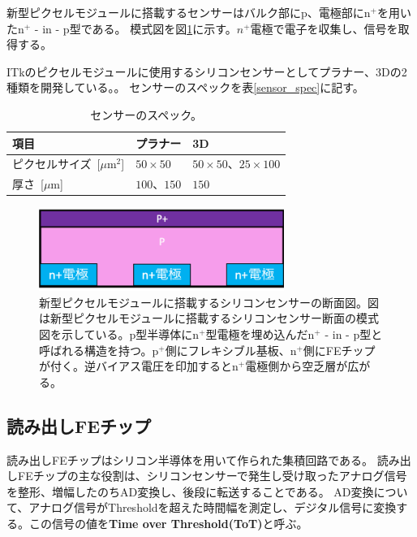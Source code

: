 新型ピクセルモジュールに搭載するセンサーはバルク部にp、電極部にn${}^+$を用いたn${}^+$ - in - p型である。
模式図を図\ref{sensor_image}に示す。$n^+$電極で電子を収集し、信号を取得する。

ITkのピクセルモジュールに使用するシリコンセンサーとしてプラナー、3Dの2種類を開発している。\cite{1-3}。
センサーのスペックを表\ref{sensor_spec}に記す。

\begin{table}[tbp]
\begin{center}
\caption[センサーのスペック]{センサーのスペック。}
\label{rd53a_spec}
  \begin{tabular}{|lll|} \hline
    項目 & プラナー & 3D \\\hline
    ピクセルサイズ~[$\mu$m${^2}$] & $50\times 50$ & $50\times 50$、$25\times 100$ \\
    厚さ~[$\mu$m] & $100、150$ & $150$  \\\hline
  \end{tabular}
\end{center}
\end{table}


\begin{figure}[bpt]\centering
\includegraphics[width=8cm]{./sensor_image.png}
\caption[新型ピクセルモジュールに搭載するシリコンセンサーの断面図]{新型ピクセルモジュールに搭載するシリコンセンサーの断面図。図は新型ピクセルモジュールに搭載するシリコンセンサー断面の模式図を示している。p型半導体にn${}^+$型電極を埋め込んだn${}^+$ - in - p型と呼ばれる構造を持つ。p${}^+$側にフレキシブル基板、n${}^+$側にFEチップが付く。逆バイアス電圧を印加するとn${}^+$電極側から空乏層が広がる。}
\label{sensor_image}
\end{figure}

\subsection{読み出しFEチップ}
読み出しFEチップはシリコン半導体を用いて作られた集積回路である。
読み出しFEチップの主な役割は、シリコンセンサーで発生し受け取ったアナログ信号を整形、増幅したのちAD変換し、後段に転送することである。
AD変換について、アナログ信号がThresholdを超えた時間幅を測定し、デジタル信号に変換する。この信号の値を\textbf{Time over Threshold(ToT)}と呼ぶ。

